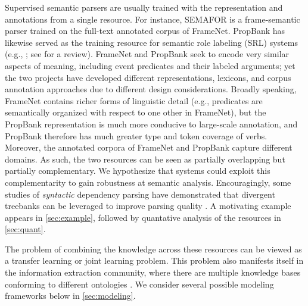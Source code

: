 \documentclass[11pt]{article}
\begin{document}
Supervised semantic parsers are usually trained with the representation and annotations from a single resource. 
For instance, SEMAFOR \citep{semafor,semafor-14} is a frame-semantic parser
trained on the full-text annotated corpus of FrameNet. 
PropBank has likewise served as the training resource for semantic role labeling (SRL) systems (e.g., \citealp{illinoisSRL}; see \citealp{palmer-10} for a review). 
FrameNet and PropBank seek to encode very similar aspects of meaning, including event predicates 
and their labeled arguments; yet the two projects have developed different representations, lexicons, 
and corpus annotation approaches due to different design considerations.
Broadly speaking, FrameNet contains richer forms of linguistic detail (e.g., predicates are semantically organized 
with respect to one other in FrameNet), but the PropBank representation is much more conducive to large-scale annotation, 
and PropBank therefore has much greater type and token coverage of verbs.
Moreover, the annotated corpora of FrameNet and PropBank capture different domains.
As such, the two resources can be seen as partially overlapping but partially complementary.
We hypothesize that systems could exploit this complementarity to gain robustness at semantic analysis. 
Encouragingly, some studies of \emph{syntactic} dependency parsing have demonstrated that divergent treebanks can be leveraged 
to improve parsing quality \citep{zhou:2013,johansson-13}.
A motivating example appears in \cref{sec:example}, followed by quantative analysis of the resources in \cref{sec:quant}.

The problem of combining the knowledge across these resources can be viewed as a 
transfer learning or joint learning problem. 
This problem also manifests itself in the information extraction community, where there are multiple knowledge bases conforming to different ontologies \citep[e.g.,][]{riedel-13}.  
We consider several possible modeling frameworks below in \cref{sec:modeling}. 
\end{document}
